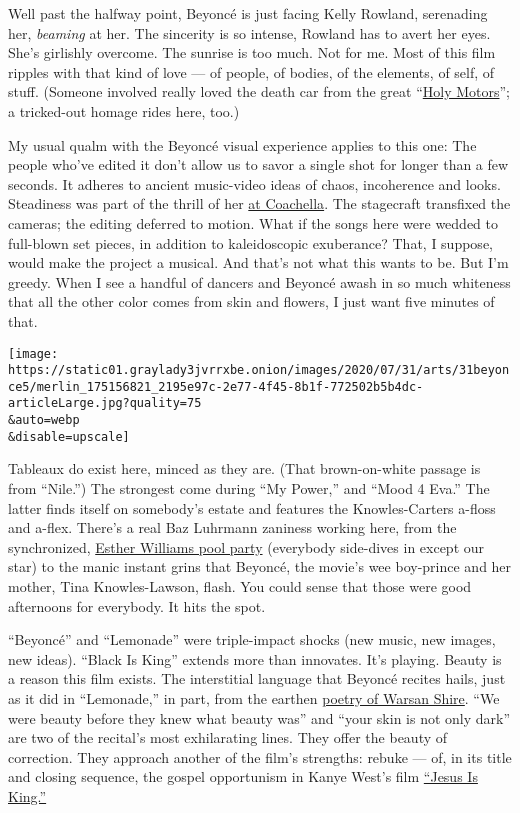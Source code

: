 Well past the halfway point, Beyoncé is just facing Kelly Rowland,
serenading her, \emph{beaming} at her. The sincerity is so intense,
Rowland has to avert her eyes. She's girlishly overcome. The sunrise is
too much. Not for me. Most of this film ripples with that kind of love
--- of people, of bodies, of the elements, of self, of stuff. (Someone
involved really loved the death car from the great
``\href{https://sgtr.files.wordpress.com/2013/01/holy-motors2.png}{Holy
Motors}''; a tricked-out homage rides here, too.)

My usual qualm with the Beyoncé visual experience applies to this one:
The people who've edited it don't allow us to savor a single shot for
longer than a few seconds. It adheres to ancient music-video ideas of
chaos, incoherence and looks. Steadiness was part of the thrill of her
\href{https://www.nytimes3xbfgragh.onion/2018/04/15/arts/music/beyonce-coachella-review.html}{at
Coachella}. The stagecraft transfixed the cameras; the editing deferred
to motion. What if the songs here were wedded to full-blown set pieces,
in addition to kaleidoscopic exuberance? That, I suppose, would make the
project a musical. And that's not what this wants to be. But I'm greedy.
When I see a handful of dancers and Beyoncé awash in so much whiteness
that all the other color comes from skin and flowers, I just want five
minutes of that.

\texttt{[image: https://static01.graylady3jvrrxbe.onion/images/2020/07/31/arts/31beyonce5/merlin\_175156821\_2195e97c-2e77-4f45-8b1f-772502b5b4dc-articleLarge.jpg?quality=75\\\&auto=webp\\\&disable=upscale]}

Tableaux do exist here, minced as they are. (That brown-on-white passage
is from ``Nile.'') The strongest come during ``My Power,'' and ``Mood 4
Eva.'' The latter finds itself on somebody's estate and features the
Knowles-Carters a-floss and a-flex. There's a real Baz Luhrmann zaniness
working here, from the synchronized,
\href{https://www.youtube.com/watch?v=gsp-LE_agns}{Esther Williams pool
party} (everybody side-dives in except our star) to the manic instant
grins that Beyoncé, the movie's wee boy-prince and her mother, Tina
Knowles-Lawson, flash. You could sense that those were good afternoons
for everybody. It hits the spot.

``Beyoncé'' and ``Lemonade'' were triple-impact shocks (new music, new
images, new ideas). ``Black Is King'' extends more than innovates. It's
playing. Beauty is a reason this film exists. The interstitial language
that Beyoncé recites hails, just as it did in ``Lemonade,'' in part,
from the earthen
\href{https://www.poetryfoundation.org/poets/warsan-shire}{poetry of
Warsan Shire}. ``We were beauty before they knew what beauty was'' and
``your skin is not only dark'' are two of the recital's most
exhilarating lines. They offer the beauty of correction. They approach
another of the film's strengths: rebuke --- of, in its title and closing
sequence, the gospel opportunism in Kanye West's film
\href{https://www.nytimes3xbfgragh.onion/2019/10/27/arts/music/kanye-west-jesus-is-king-review.html}{``Jesus
Is King.''}

